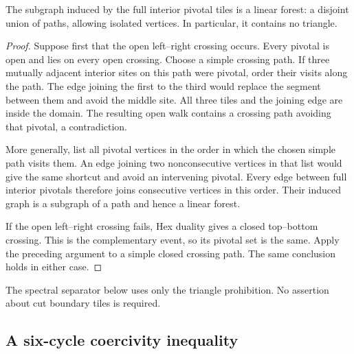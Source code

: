 \begin{lemma}\label{lem:forest}
The subgraph induced by the full interior pivotal tiles is a linear forest: a disjoint union of paths, allowing isolated vertices. In particular, it contains no triangle.
\end{lemma}
\begin{proof}
Suppose first that the open left--right crossing occurs. Every pivotal is open and lies on every open crossing. Choose a simple crossing path. If three mutually adjacent interior sites on this path were pivotal, order their visits along the path. The edge joining the first to the third would replace the segment between them and avoid the middle site. All three tiles and the joining edge are inside the domain. The resulting open walk contains a crossing path avoiding that pivotal, a contradiction.

More generally, list all pivotal vertices in the order in which the chosen simple path visits them. An edge joining two nonconsecutive vertices in that list would give the same shortcut and avoid an intervening pivotal. Every edge between full interior pivotals therefore joins consecutive vertices in this order. Their induced graph is a subgraph of a path and hence a linear forest.

If the open left--right crossing fails, Hex duality gives a closed top--bottom crossing. This is the complementary event, so its pivotal set is the same. Apply the preceding argument to a simple closed crossing path. The same conclusion holds in either case.
\end{proof}

The spectral separator below uses only the triangle prohibition. No assertion about cut boundary tiles is required.

\subsection{A six-cycle coercivity inequality}\label{sec:coercivity}

